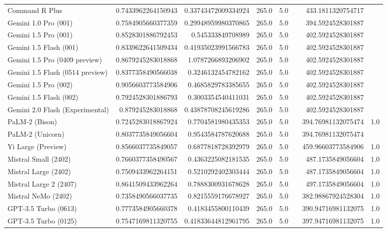\begin{table}[htp]
{\begin{tabular}{lrrrrrrr}
Command R Plus & 0.7433962264150943 & 0.33743472009334924 & 265.0 & 5.0 &  & 433.1811320754717 &  \\
Gemini 1.0 Pro (001) & 0.7584905660377359 & 0.29948959980370865 & 265.0 & 5.0 &  & 394.5924528301887 &  \\
Gemini 1.5 Pro (001) & 0.8528301886792453 & 0.545333849708989 & 265.0 & 5.0 &  & 402.5924528301887 &  \\
Gemini 1.5 Flash (001) & 0.8339622641509434 & 0.41935023991566783 & 265.0 & 5.0 &  & 402.5924528301887 &  \\
Gemini 1.5 Pro (0409 preview) & 0.8679245283018868 & 1.0787266893206902 & 265.0 & 5.0 &  & 402.5924528301887 &  \\
Gemini 1.5 Flash (0514 preview) & 0.8377358490566038 & 0.3246132454782162 & 265.0 & 5.0 &  & 402.5924528301887 &  \\
Gemini 1.5 Pro (002) & 0.9056603773584906 & 0.4685829783385655 & 265.0 & 5.0 &  & 402.5924528301887 &  \\
Gemini 1.5 Flash (002) & 0.7924528301886793 & 0.3003354540411031 & 265.0 & 5.0 &  & 402.5924528301887 &  \\
Gemini 2.0 Flash (Experimental) & 0.879245283018868 & 0.43878708245619286 & 265.0 & 5.0 &  & 402.5924528301887 &  \\
PaLM-2 (Bison) & 0.7245283018867924 & 0.7704581980435353 & 265.0 & 5.0 &  & 394.76981132075474 & 1.0 \\
PaLM-2 (Unicorn) & 0.8037735849056604 & 0.9543584787620688 & 265.0 & 5.0 &  & 394.76981132075474 &  \\
Yi Large (Preview) & 0.8566037735849057 & 0.6877818728392979 & 265.0 & 5.0 &  & 459.96603773584906 & 1.0 \\
Mistral Small (2402) & 0.7660377358490567 & 0.4363225082181535 & 265.0 & 5.0 &  & 487.1735849056604 & 1.0 \\
Mistral Large (2402) & 0.7509433962264151 & 0.5210292402303444 & 265.0 & 5.0 &  & 487.1735849056604 & 1.0 \\
Mistral Large 2 (2407) & 0.8641509433962264 & 0.7888300931678628 & 265.0 & 5.0 &  & 497.1735849056604 & 1.0 \\
Mistral NeMo (2402) & 0.7358490566037735 & 0.8215559176678927 & 265.0 & 5.0 &  & 382.98867924528304 & 1.0 \\
GPT-3.5 Turbo (0613) & 0.7773584905660378 & 0.4183455800110439 & 265.0 & 5.0 &  & 390.94716981132075 & 1.0 \\
GPT-3.5 Turbo (0125) & 0.7547169811320755 & 0.41833644812961795 & 265.0 & 5.0 &  & 397.94716981132075 & 1.0 \\

\end{tabular}}
\end{table}
